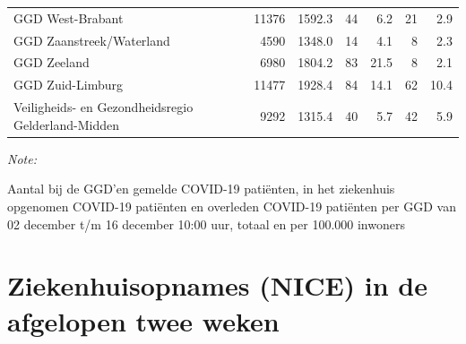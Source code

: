 \documentclass[
  english,
  man,floatsintext]{apa6}
\begin{document}
\begin{table}
\begin{threeparttable}
\begin{tabular}{lrrrrrr}
GGD West-Brabant & 11376 & 1592.3 & 44 & 6.2 & 21 & 2.9\\
GGD Zaanstreek/Waterland & 4590 & 1348.0 & 14 & 4.1 & 8 & 2.3\\
GGD Zeeland & 6980 & 1804.2 & 83 & 21.5 & 8 & 2.1\\
GGD Zuid-Limburg & 11477 & 1928.4 & 84 & 14.1 & 62 & 10.4\\
Veiligheids- en Gezondheidsregio Gelderland-Midden & 9292 & 1315.4 & 40 & 5.7 & 42 & 5.9\\
\bottomrule
\end{tabular}
\begin{tablenotes}
\item \textit{Note: } 
\item Aantal bij de GGD’en gemelde COVID-19 patiënten, in het ziekenhuis opgenomen COVID-19 patiënten en overleden COVID-19 patiënten per GGD van 02 december t/m 16 december 10:00 uur, totaal en per 100.000 inwoners
\end{tablenotes}
\end{threeparttable}
\endgroup{}
\end{table}

\newpage

\hypertarget{ziekenhuisopnames-nice-in-de-afgelopen-twee-weken}{%
\section{Ziekenhuisopnames (NICE) in de afgelopen twee weken}\label{ziekenhuisopnames-nice-in-de-afgelopen-twee-weken}}
\end{document}

